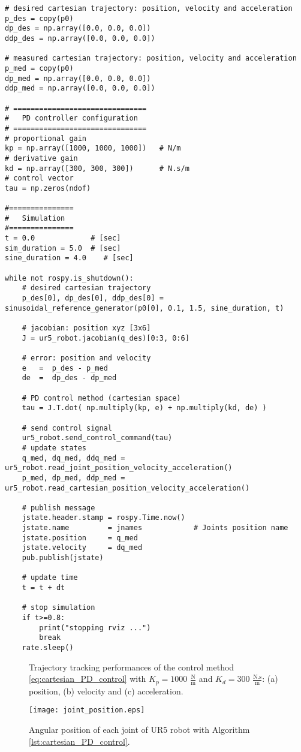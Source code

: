 \begin{lstlisting}
# desired cartesian trajectory: position, velocity and acceleration
p_des = copy(p0)
dp_des = np.array([0.0, 0.0, 0.0])
ddp_des = np.array([0.0, 0.0, 0.0])

# measured cartesian trajectory: position, velocity and acceleration
p_med = copy(p0)
dp_med = np.array([0.0, 0.0, 0.0])
ddp_med = np.array([0.0, 0.0, 0.0])

# ===============================
#   PD controller configuration
# ===============================
# proportional gain
kp = np.array([1000, 1000, 1000])   # N/m
# derivative gain   
kd = np.array([300, 300, 300])      # N.s/m
# control vector
tau = np.zeros(ndof)    

#===============
#   Simulation
#===============
t = 0.0             # [sec] 
sim_duration = 5.0  # [sec]
sine_duration = 4.0    # [sec]

while not rospy.is_shutdown():
    # desired cartesian trajectory
    p_des[0], dp_des[0], ddp_des[0] = sinusoidal_reference_generator(p0[0], 0.1, 1.5, sine_duration, t)

    # jacobian: position xyz [3x6]
    J = ur5_robot.jacobian(q_des)[0:3, 0:6]     
    
    # error: position and velocity
    e 	=  p_des - p_med
    de 	=  dp_des - dp_med    

    # PD control method (cartesian space)
    tau = J.T.dot( np.multiply(kp, e) + np.multiply(kd, de) )
    
    # send control signal
    ur5_robot.send_control_command(tau)
    # update states
    q_med, dq_med, ddq_med = ur5_robot.read_joint_position_velocity_acceleration()
    p_med, dp_med, ddp_med = ur5_robot.read_cartesian_position_velocity_acceleration()

    # publish message
    jstate.header.stamp = rospy.Time.now()
    jstate.name 		= jnames			# Joints position name
    jstate.position 	= q_med
    jstate.velocity 	= dq_med
    pub.publish(jstate)

    # update time
    t = t + dt
    
    # stop simulation
    if t>=0.8:
        print("stopping rviz ...")
        break
    rate.sleep()
\end{lstlisting}

\vspace*{0cm}
\begin{figure}[H]
	\centering
	\caption{Trajectory tracking performances of the control method \eqref{eq:cartesian_PD_control} with  ${K_{p}}=1000$ $\mathrm{\frac{N}{m}}$ and $K_{d}= 300$ $\mathrm{\frac{N.s}{m}}$: (a) position, (b) velocity and (c) acceleration.}
	\label{fig:act_1.4_ee_position}
\end{figure}

\begin{figure}
    \centering
    \texttt{[image: joint\_position.eps]}	
    \caption{Angular position of each joint of UR5 robot with Algorithm \ref{lst:cartesian_PD_control}.}
    \label{fig:act_1.4_joint_position}
\end{figure}
